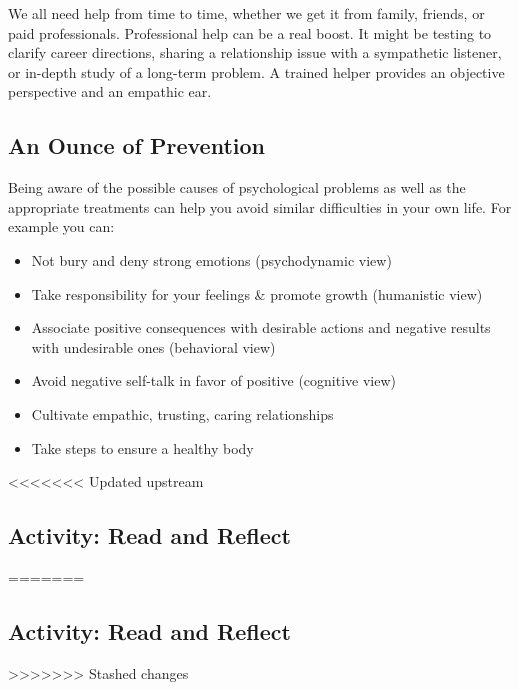 \documentclass[
]{book}
\providecommand{\tightlist}{%
  \setlength{\itemsep}{0pt}\setlength{\parskip}{0pt}}
\begin{document}
We all need help from time to time, whether we get it from family, friends, or paid professionals. Professional help can be a real boost. It might be testing to clarify career directions, sharing a relationship issue with a sympathetic listener, or in-depth study of a long-term problem. A trained helper provides an objective perspective and an empathic ear.

\hypertarget{an-ounce-of-prevention}{%
\subsection*{An Ounce of Prevention}\label{an-ounce-of-prevention}}

Being aware of the possible causes of psychological problems as well as the appropriate treatments can help you avoid similar difficulties in your own life. For example you can:

\begin{itemize}
\tightlist
\item
  Not bury and deny strong emotions (psychodynamic view)\\
\item
  Take responsibility for your feelings \& promote growth (humanistic view)\\
\item
  Associate positive consequences with desirable actions and negative results with undesirable ones (behavioral view)\\
\item
  Avoid negative self-talk in favor of positive (cognitive view)\\
\item
  Cultivate empathic, trusting, caring relationships\\
\item
  Take steps to ensure a healthy body
\end{itemize}

<<<<<<< Updated upstream
\hypertarget{activity-read-and-reflect-22}{%
\subsection*{Activity: Read and Reflect}\label{activity-read-and-reflect-22}}
=======
\hypertarget{activity-read-and-reflect-21}{%
\subsection*{Activity: Read and Reflect}\label{activity-read-and-reflect-21}}
>>>>>>> Stashed changes
\end{document}
